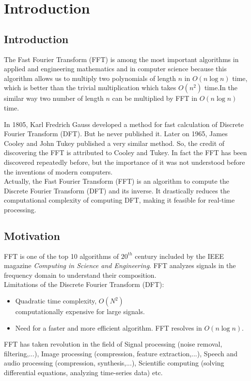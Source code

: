 \documentclass[28pt]{report}
\begin{document}
\tableofcontents
\pagebreak
\chapter{Introduction}
\section{Introduction}
The Fast Fourier Transform (FFT) is among the most important algorithms
in applied and engineering mathematics and in computer science because this algorithm allows us to multiply two polynomials of length 
$n$ in 
$O(n \log n)$ time, which is better than the trivial multiplication which takes 
$O(n^2)$ time.In the similar way two number of length $n$ can be multiplied by FFT in $O(n \log n)$ time. \linebreak 

In 1805, Karl Fredrich Gauss developed a method for fast calculation of Discrete Fourier Transform (DFT). But he never published it. Later on 1965, James Cooley and John Tukey published a very similar method. So, the credit of discovering the FFT is attributed to Cooley and Tukey. In fact the FFT has been discovered repeatedly before, but the importance of it was not understood before the inventions of modern computers. \\


Actually, the Fast Fourier Transform (FFT) is an algorithm to compute the Discrete Fourier Transform (DFT) and its inverse. It drastically reduces the computational complexity of computing
DFT, making it feasible for real-time processing.
\pagebreak
\section{Motivation}
FFT is one of the top 10 algorithms of $20^{th}$ century included by the IEEE magazine {\it{Computing in Science and Engineering}}. FFT analyzes signals in the frequency domain to understand their
composition.\\ Limitations of the Discrete Fourier Transform (DFT):
 \begin{itemize}
        \item Quadratic time complexity, $O(N^2)$ \\ computationally expensive for large signals.
        \item Need for a faster and more efficient algorithm. FFT resolves in $O(n\log n)$.
      \end{itemize}
       FFT has taken revolution in the field of Signal processing (noise removal, filtering,...), Image processing (compression, feature extraction,...), Speech and audio processing (compression, synthesis,...), Scientific computing (solving differential equations, analyzing time-series data) etc.
       
\end{document}
